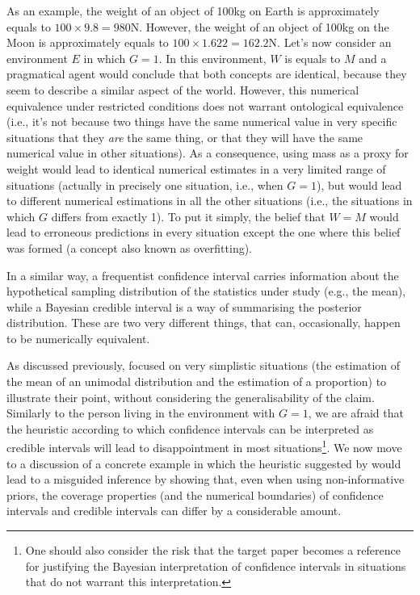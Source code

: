 \documentclass[a4paper,man,natbib,floatsintext,donotrepeattitle]{apa6}
\begin{document}
As an example, the weight of an object of 100kg on Earth is approximately equals to $100 \times 9.8 = 980 \text{N}$. However, the weight of an object of 100kg on the Moon is approximately equals to $100 \times 1.622 = 162.2\text{N}$. Let's now consider an environment $E$ in which $G = 1$. In this environment, $W$ is equals to $M$ and a pragmatical agent would conclude that both concepts are identical, because they seem to describe a similar aspect of the world. However, this numerical equivalence under restricted conditions does not warrant ontological equivalence (i.e., it's not because two things have the same numerical value in very specific situations that they \textit{are} the same thing, or that they will have the same numerical value in other situations). As a consequence, using mass as a proxy for weight would lead to identical numerical estimates in a very limited range of situations (actually in precisely one situation, i.e., when $G = 1$), but would lead to different numerical estimations in all the other situations (i.e., the situations in which $G$ differs from exactly 1). To put it simply, the belief that $W = M$ would lead to erroneous predictions in every situation except the one where this belief was formed (a concept also known as overfitting).

In a similar way, a frequentist confidence interval carries information about the hypothetical sampling distribution of the statistics under study (e.g., the mean), while a Bayesian credible interval is a way of summarising the posterior distribution. These are two very different things, that can, occasionally, happen to be numerically equivalent.

As discussed previously, \cite{albers_credible_2018} focused on very simplistic situations (the estimation of the mean of an unimodal distribution and the estimation of a proportion) to illustrate their point, without considering the generalisability of the claim. Similarly to the person living in the environment with $G = 1$, we are afraid that the heuristic according to which confidence intervals can be interpreted as credible intervals will lead to disappointment in most situations\footnote{One should also consider the risk that the target paper becomes a reference for justifying the Bayesian interpretation of confidence intervals in situations that do not warrant this interpretation.}. We now move to a discussion of a concrete example in which the heuristic suggested by \cite{albers_credible_2018} would lead to a misguided inference by showing that, even when using non-informative priors, the coverage properties (and the numerical boundaries) of confidence intervals and credible intervals can differ by a considerable amount.
\end{document}
